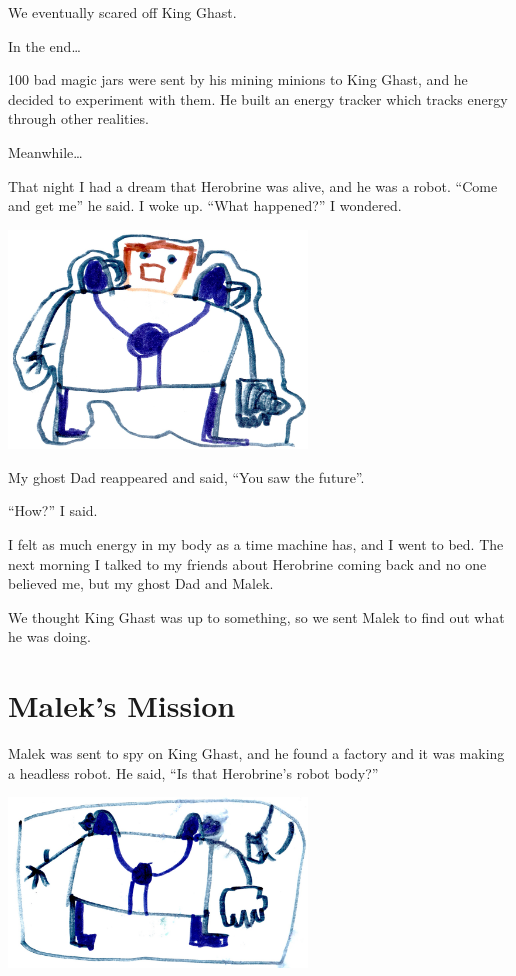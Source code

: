 \documentclass[12pt,oneside]{krantz}
\begin{document}
We eventually scared off King Ghast.

In the end\ldots{}

100 bad magic jars were sent by his mining minions to King Ghast, and he
decided to experiment with them. He built an energy tracker which tracks
energy through other realities.

Meanwhile\ldots{}

That night I had a dream that Herobrine was alive, and he was a robot.
``Come and get me'' he said. I woke up. ``What happened?'' I wondered.

\includegraphics[width=3.125in,height=\textheight]{img/king-ghast/09-herobrine.jpg}

My ghost Dad reappeared and said, ``You saw the future''.

``How?'' I said.

I felt as much energy in my body as a time machine has, and I went to
bed. The next morning I talked to my friends about Herobrine coming back
and no one believed me, but my ghost Dad and Malek.

We thought King Ghast was up to something, so we sent Malek to find out
what he was doing.

\hypertarget{maleks-mission}{%
\chapter{Malek's Mission}\label{maleks-mission}}

Malek was sent to spy on King Ghast, and he found a factory and it was
making a headless robot. He said, ``Is that Herobrine's robot body?''

\includegraphics[width=3.125in,height=\textheight]{img/king-ghast/10-herobrine.jpg}
\end{document}
